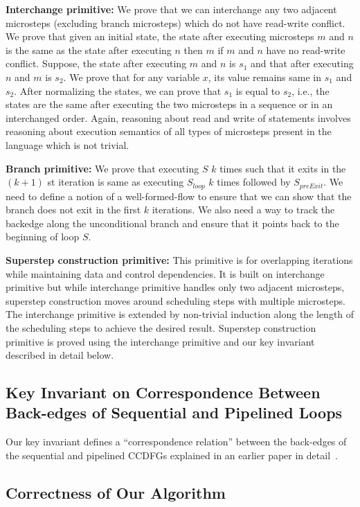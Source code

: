   {\bf Interchange primitive:} We prove that we can interchange any two adjacent microsteps
 (excluding branch microsteps) which do not have read-write conflict. We prove that given an initial state, 
 the state after executing microsteps $m$ and $n$ is the same as the state after
  executing $n$ then $m$ if $m$ and $n$ have no read-write
  conflict. Suppose, the state after executing $m$ and $n$ is $s_1$ and 
  that after executing $n$ and $m$ is $s_2$. We prove that for any variable $x$, its
  value remains same in $s_1$ and $s_2$. After normalizing
  the states, we can prove that $s_1$ is equal to $s_2$, i.e.,
  the states are the same after executing the two microsteps in
  a sequence or in an interchanged order. Again, reasoning about read and
  write of statements involves reasoning about execution
  semantics of all types of microsteps present in the
  language which is not trivial.

{\bf Branch primitive:} We prove that executing $S$ $k$ times such that it exits 
in the $(k+1)$ st iteration is same as executing $S_{loop}$ $k$ times followed by $S_{preExit}$. We need to define a notion of a well-formed-flow to ensure that we can show that the 
branch does not exit in the first $k$ iterations. We also need a way to track the backedge along the 
unconditional branch and ensure that it points back to the beginning of loop $S$.
 
{\bf Superstep construction primitive:} This primitive is for overlapping iterations while 
maintaining data and control dependencies. It is built on interchange primitive but while interchange primitive
handles only two adjacent microsteps, superstep construction moves around scheduling steps with multiple microsteps. 
The interchange primitive is extended by non-trivial induction along the length of the scheduling steps to achieve the desired result. 
Superstep construction primitive is proved using the 
interchange primitive and our key invariant described in detail below. 

\subsection{Key Invariant on Correspondence Between Back-edges of Sequential and Pipelined Loops}
 Our key invariant defines a ``correspondence relation''
between the back-edges of the sequential and pipelined CCDFGs explained in an earlier paper in detail~\cite{disha-itp14}. 

\subsection{Correctness of Our Algorithm}

